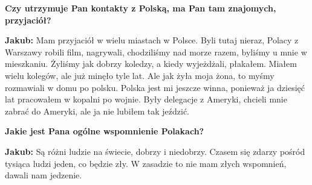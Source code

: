 \textbf{Czy utrzymuje Pan kontakty z Polską, ma Pan tam znajomych, przyjaciół?} 

\textbf{Jakub:} Mam przyjaciół w wielu miastach w Polsce. Byli tutaj nieraz, Polacy z Warszawy robili film, nagrywali, chodziliśmy nad morze razem, byliśmy u mnie w mieszkaniu. Żyliśmy jak dobrzy koledzy, a kiedy wyjeżdżali, płakałem. Miałem wielu kolegów, ale już minęło tyle lat. Ale jak żyła moja żona, to myśmy rozmawiali w domu po polsku. Polska jest mi jeszcze winna, ponieważ ja dziesięć lat pracowałem w kopalni po wojnie. Były delegacje z Ameryki, chcieli mnie zabrać do Ameryki, ale ja nie lubiłem tak jeździć. 

\textbf{Jakie jest Pana ogólne wspomnienie Polakach?}

\textbf{Jakub:} Są różni ludzie na świecie, dobrzy i niedobrzy. Czasem się zdarzy pośród tysiąca ludzi jeden, co będzie zły. W zasadzie to nie mam złych wspomnień, dawali nam jedzenie.  